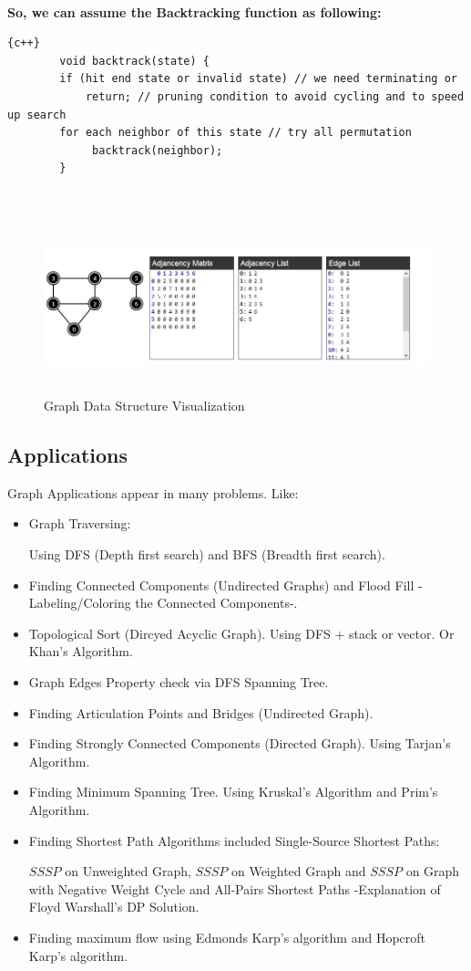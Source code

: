 \\
\newline
\textbf{{\Large{So, we can assume the Backtracking function as following:}}}


\begin{lstlisting}{c++}
        void backtrack(state) {
        if (hit end state or invalid state) // we need terminating or
            return; // pruning condition to avoid cycling and to speed up search
        for each neighbor of this state // try all permutation
             backtrack(neighbor);
        }
\end{lstlisting}
\\
\newline
\begin{figure}[h]
\includegraphics[width=15cm, height=5cm]{GraphRepresentation.png}
 \caption{Graph Data Structure Visualization}
    \label{fig:GraphRepresentation}
\end{figure}


\subsection{Applications}
Graph Applications appear in many problems. Like:
\begin{itemize}
\item Graph Traversing: 

Using DFS (Depth first search) and BFS (Breadth first search).
\item Finding Connected Components (Undirected Graphs) and Flood Fill -Labeling/Coloring the Connected Components-.
\item Topological Sort (Dircyed Acyclic Graph). Using DFS + stack or vector. Or Khan's Algorithm.
\item Graph Edges Property check via DFS Spanning Tree.
\item Finding Articulation Points and Bridges (Undirected Graph). \item Finding Strongly Connected Components (Directed Graph). Using Tarjan's Algorithm.
\item Finding Minimum Spanning Tree. Using Kruskal’s Algorithm and Prim’s Algorithm.
\item Finding Shortest Path Algorithms included Single-Source Shortest Paths:

$SSSP$ on Unweighted Graph, $SSSP$ on Weighted Graph and $SSSP$ on Graph with Negative Weight Cycle and All-Pairs Shortest Paths -Explanation of Floyd Warshall’s DP Solution. 
\item Finding maximum flow using Edmonds Karp’s algorithm and Hopcroft Karp’s algorithm.
\end{itemize}

